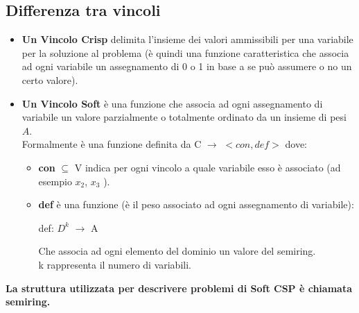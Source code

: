 \subsection{Differenza tra vincoli}
\begin{itemize}
    \item \textbf{Un Vincolo Crisp} delimita l'insieme dei valori ammissibili
          per una variabile per la soluzione al problema (è quindi una funzione
          caratteristica che associa ad ogni variabile un assegnamento di 0 o 1 in
          base a se può assumere o no un certo valore).
    \item \textbf{Un Vincolo Soft} è una funzione che associa ad ogni
          assegnamento di variabile un valore parzialmente o totalmente ordinato
          da un insieme di pesi $A$.
          \\Formalmente è una funzione definita da C $\rightarrow$
          $<con, def>$ dove:

          \begin{itemize}
              \item \textbf{con} $\subseteq$ V indica per ogni vincolo a quale
                    variabile esso è associato (ad esempio $x_2 $, $x_3$ ).
              \item \textbf{def} è una funzione (è il peso associato ad ogni
                    assegnamento di variabile):
                    \begin{center}
                        def: $D^k$ $\rightarrow$ A

                        Che associa ad ogni elemento del dominio un valore del
                        semiring. \\k rappresenta il numero di variabili.
                    \end{center}
          \end{itemize}
\end{itemize}
\textbf{La struttura utilizzata per descrivere problemi di Soft CSP è chiamata semiring.}

